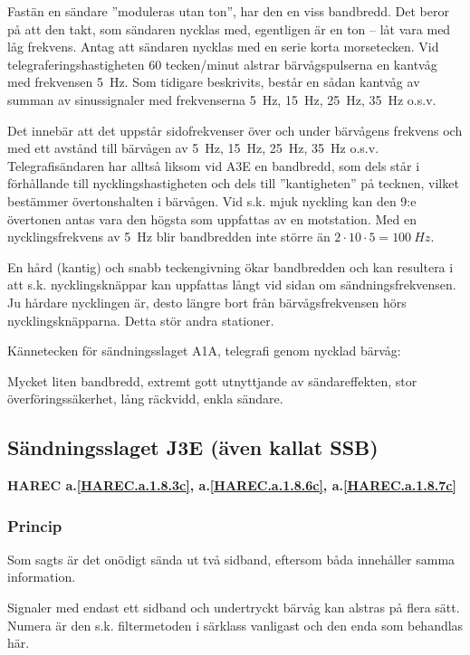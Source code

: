 Fastän en sändare ''moduleras utan ton'', har den en viss bandbredd. Det beror på
att den takt, som sändaren nycklas med, egentligen är en ton -- låt vara med låg
frekvens. Antag att sändaren nycklas med en serie korta morsetecken. Vid
telegraferingshastigheten 60 tecken/minut alstrar bärvågspulserna en kantvåg
med frekvensen 5~Hz. Som tidigare beskrivits, består en sådan kantvåg av summan
av sinussignaler med frekvenserna 5~Hz, 15~Hz, 25~Hz, 35~Hz o.s.v.

Det innebär att det uppstår sidofrekvenser över och under bärvågens frekvens och
med ett avstånd till bärvågen av 5~Hz, 15~Hz, 25~Hz, 35~Hz o.s.v.
Telegrafisändaren har alltså liksom vid A3E en bandbredd, som dels står i
förhållande till nycklingshastigheten och dels till ''kantigheten'' på tecknen,
vilket bestämmer övertonshalten i bärvågen. Vid s.k. mjuk nyckling kan den 9:e
övertonen antas vara den högsta som uppfattas av en motstation. Med en
nycklingsfrekvens av 5~Hz blir bandbredden inte större än
\(2 \cdot 10 \cdot 5 = 100\ Hz\).

En hård (kantig) och snabb teckengivning ökar bandbredden och kan resultera i
att s.k. nycklingsknäppar kan uppfattas långt vid sidan om sändningsfrekvensen.
Ju hårdare nycklingen är, desto längre bort från bärvågsfrekvensen hörs
nycklingsknäpparna. Detta stör andra stationer.

Kännetecken för sändningsslaget A1A, telegrafi genom nycklad bärvåg:

Mycket liten bandbredd, extremt gott utnyttjande av sändareffekten, stor
överföringssäkerhet, lång räckvidd, enkla sändare.

\subsection{Sändningsslaget J3E (även kallat SSB)}
\textbf{HAREC a.\ref{HAREC.a.1.8.3c}, a.\ref{HAREC.a.1.8.6c}, a.\ref{HAREC.a.1.8.7c}\label{myHAREC.a.1.8.3c}\label{myHAREC.a.1.8.6c}\label{myHAREC.a.1.8.7c}}

\subsubsection{Princip}

Som sagts är det onödigt sända ut två sidband, eftersom båda innehåller samma
information.

Signaler med endast ett sidband och undertryckt bärvåg kan alstras på flera
sätt. Numera är den s.k. filtermetoden i särklass vanligast och den enda som
behandlas här.

